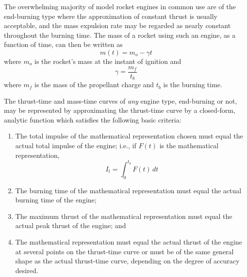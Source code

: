 The overwhelming majority of model rocket engines in common use are of the end-burning type where the
approximation of constant thrust is usually acceptable, and the mass expulsion rate may be regarded as
nearly constant throughout the burning time. The mass of a rocket using such an engine, as a function of
time, can then be written as
\begin{equation}\label{ch4:eq:70}
m(t) = m_o - \gamma t
\end{equation}
where $m_o$ is the rocket's mass at the instant of ignition and
\begin{equation}\label{ch4:eq:71}
\gamma = \frac{m_f}{t_b}
\end{equation}
where $m_f$ is the mass of the propellant charge and $t_b$ is the burning time.

The thrust-time and mass-time curves of \emph{any} engine type, end-burning or not, may be represented by
approximating the thrust-time curve by a closed-form, analytic function which satisfies the following basic
criteria:
\begin{enumerate}[label=(\alph*)]
  \item The total impulse of the mathematical representation chosen must equal the actual total impulse of
    the engine; i.e., if $F(t)$ is the mathematical representation,
    \begin{equation}\label{ch4:eq:72}
    I_t = \int_{0}^{t_b} F(t)\,dt
    \end{equation}
  \item The burning time of the mathematical representation must equal the actual burning time of the
    engine;
  \item The maximum thrust of the mathematical representation must equal the actual peak thrust of the
    engine; and
  \item The mathematical representation must equal the actual thrust of the engine at several points on the
    thrust-time curve or must be of the same general shape as the actual thrust-time curve, depending on the
    degree of accuracy desired.
\end{enumerate}

